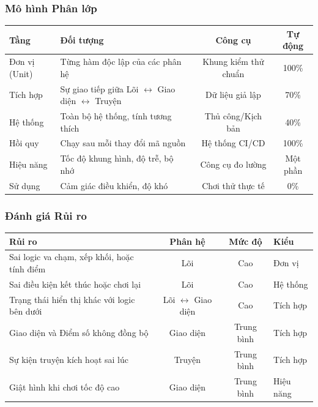 \documentclass[12pt,a4paper]{article}
\begin{document}
\subsubsection{Mô hình Phân lớp}

\begin{center}
\begin{adjustbox}{max width=\linewidth}
\begin{tabular}{|l|p{6cm}|c|c|}
\hline
{}
\textbf{Tầng} & \textbf{Đối tượng} & \textbf{Công cụ} & \textbf{Tự động} \\ \hline
Đơn vị (Unit) & Từng hàm độc lập của các phân hệ & Khung kiểm thử chuẩn & 100\% \\ \hline
Tích hợp & Sự giao tiếp giữa Lõi $\leftrightarrow$ Giao diện $\leftrightarrow$ Truyện & Dữ liệu giả lập & 70\% \\ \hline
Hệ thống & Toàn bộ hệ thống, tính tương thích & Thủ công/Kịch bản & 40\% \\ \hline
Hồi quy & Chạy sau mỗi thay đổi mã nguồn & Hệ thống CI/CD & 100\% \\ \hline
Hiệu năng & Tốc độ khung hình, độ trễ, bộ nhớ & Công cụ đo lường & Một phần \\ \hline
Sử dụng & Cảm giác điều khiển, độ khó & Chơi thử thực tế & 0\% \\ \hline
\end{tabular}
\end{adjustbox}
\end{center}

\subsubsection{Đánh giá Rủi ro}
\begin{center}
\begin{adjustbox}{max width=\linewidth}
\begin{tabular}{|p{5.5cm}|c|c|l|}
\hline
\rowcolor{gray!35}
\textbf{Rủi ro} & \textbf{Phân hệ} & \textbf{Mức độ} & \textbf{Kiểu} \\ \hline
Sai logic va chạm, xếp khối, hoặc tính điểm & Lõi & Cao & Đơn vị \\ \hline
Sai điều kiện kết thúc hoặc chơi lại & Lõi & Cao & Hệ thống \\ \hline
Trạng thái hiển thị khác với logic bên dưới & Lõi $\leftrightarrow$ Giao diện & Cao & Tích hợp \\ \hline
Giao diện và Điểm số không đồng bộ & Giao diện & Trung bình & Tích hợp \\ \hline
Sự kiện truyện kích hoạt sai lúc & Truyện & Trung bình & Tích hợp \\ \hline
Giật hình khi chơi tốc độ cao & Giao diện & Trung bình & Hiệu năng \\ \hline
\end{tabular}
\end{adjustbox}
\end{center}
\end{document}
